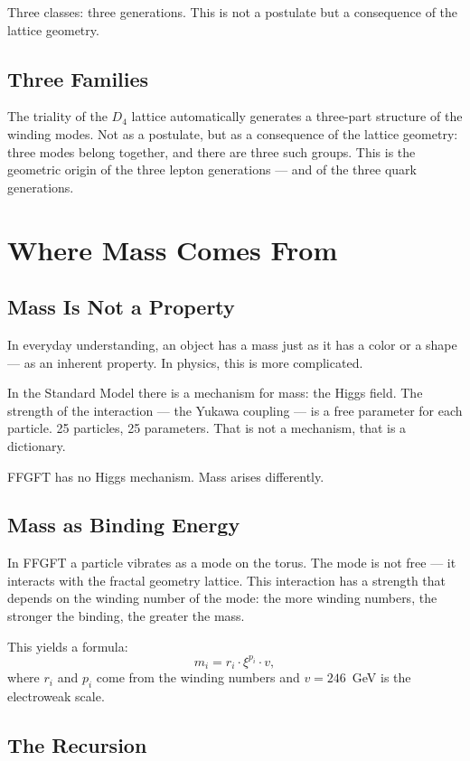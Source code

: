 \documentclass[12pt,oneside]{book}
\begin{document}
Three classes: three generations. This is not a postulate but a consequence of the lattice geometry.

\section{Three Families}

The triality of the $D_4$ lattice automatically generates a three-part structure of the winding modes. Not as a postulate, but as a consequence of the lattice geometry: three modes belong together, and there are three such groups. This is the geometric origin of the three lepton generations --- and of the three quark generations.

\chapter{Where Mass Comes From}

\section{Mass Is Not a Property}

In everyday understanding, an object has a mass just as it has a color or a shape --- as an inherent property. In physics, this is more complicated.

In the Standard Model there is a mechanism for mass: the Higgs field. The strength of the interaction --- the Yukawa coupling --- is a free parameter for each particle. 25 particles, 25 parameters. That is not a mechanism, that is a dictionary.

FFGFT has no Higgs mechanism. Mass arises differently.

\section{Mass as Binding Energy}

In FFGFT a particle vibrates as a mode on the torus. The mode is not free --- it interacts with the fractal geometry lattice. This interaction has a strength that depends on the winding number of the mode: the more winding numbers, the stronger the binding, the greater the mass.

This yields a formula:
\[
m_i = r_i \cdot \xi^{p_i} \cdot v,
\]
where $r_i$ and $p_i$ come from the winding numbers and $v = 246$~GeV is the electro\-weak scale.

\section{The Recursion}
\end{document}
